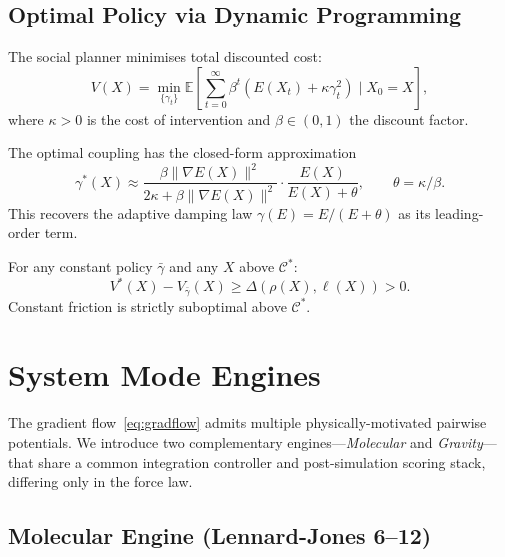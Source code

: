 \documentclass[final]{siamltex}
\newcommand{\E}{\mathbb{E}}
\newcommand{\norm}[1]{\lVert #1 \rVert}
\providecommand{\grad}{\nabla}
\newcommand{\Cman}{\mathcal{C}^*}
\begin{document}
\subsection{Optimal Policy via Dynamic Programming}

The social planner minimises total discounted cost:
\begin{equation}\label{eq:dp}
  V(X) = \min_{\{\gamma_t\}}\E\!\left[\sum_{t=0}^\infty\beta^t
  (E(X_t)+\kappa\gamma_t^2)\;\Big|\;X_0=X\right],
\end{equation}
where $\kappa>0$ is the cost of intervention and $\beta\in(0,1)$
the discount factor.

\begin{theorem}\label{thm:optimal}
The optimal coupling has the closed-form approximation
\begin{equation}\label{eq:gammastar}
  \gamma^*(X) \approx
  \frac{\beta\norm{\grad E(X)}^2}{2\kappa+\beta\norm{\grad E(X)}^2}
  \cdot\frac{E(X)}{E(X)+\theta},\qquad
  \theta=\kappa/\beta.
\end{equation}
This recovers the adaptive damping law $\gamma(E)=E/(E+\theta)$ as
its leading-order term.
\end{theorem}

\begin{theorem}\label{thm:necessity}
For any constant policy $\bar{\gamma}$ and any $X$ above $\Cman$:
\[
  V^*(X)-V_{\bar{\gamma}}(X)\ge\Delta(\rho(X),\ell(X))>0.
\]
Constant friction is strictly suboptimal above $\Cman$.
\end{theorem}


\section{System Mode Engines}\label{sec:engines}

The gradient flow~\eqref{eq:gradflow} admits multiple
physically-motivated pairwise potentials.  We introduce two
complementary engines---\emph{Molecular} and \emph{Gravity}---that
share a common integration controller and post-simulation scoring
stack, differing only in the force law.

\subsection{Molecular Engine (Lennard-Jones 6--12)}\label{sec:molecular}
\end{document}
